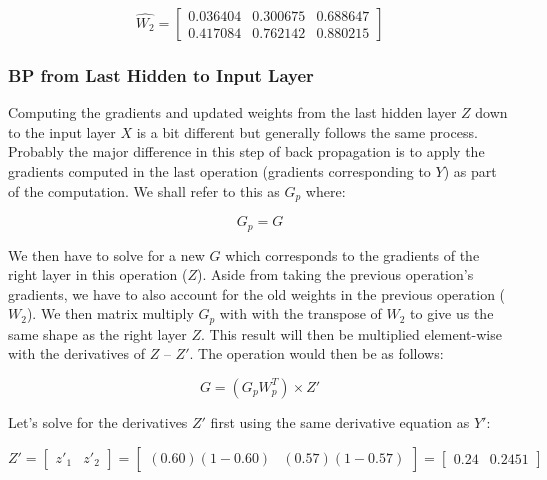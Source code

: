 \documentclass[a4paper]{article}
\begin{document}
\begin{equation}
  \widehat{W_{2}}=
    \begin{bmatrix}
      0.036404 & 0.300675 & 0.688647 \\
      0.417084 & 0.762142 & 0.880215
    \end{bmatrix}
\end{equation}

\subsubsection{BP from Last Hidden to Input Layer}

Computing the gradients and updated weights from the last hidden layer $Z$ down to the input layer $X$ is a bit different but generally follows the same process. Probably the major difference in this step of back propagation is to apply the gradients computed in the last operation (gradients corresponding to $Y$) as part of the computation. We shall refer to this as $G_{p}$ where:

\begin{equation}
  G_{p} = G
\end{equation}

We then have to solve for a new $G$ which corresponds to the gradients of the right layer in this operation ($Z$). Aside from taking the previous operation's gradients, we have to also account for the old weights in the previous operation ($W_{2}$). We then matrix multiply $G_{p}$ with with the transpose of $W_{2}$ to give us the same shape as the right layer $Z$. This result will then be multiplied element-wise with the derivatives of $Z$ -- $Z'$. The operation would then be as follows:

\begin{equation}
  G = (G_{p}W_{p}^T) \times Z'
\end{equation}

Let's solve for the derivatives $Z'$ first using the same derivative equation as $Y'$:

\begin{equation}
  Z'=
    \begin{bmatrix}
      z'_{1} & z'_{2}
    \end{bmatrix}
    =
    \begin{bmatrix}
      (0.60)(1 - 0.60) & (0.57)(1 - 0.57)
    \end{bmatrix}
    =
    \begin{bmatrix}
      0.24 & 0.2451
    \end{bmatrix}
\end{equation}
\end{document}
